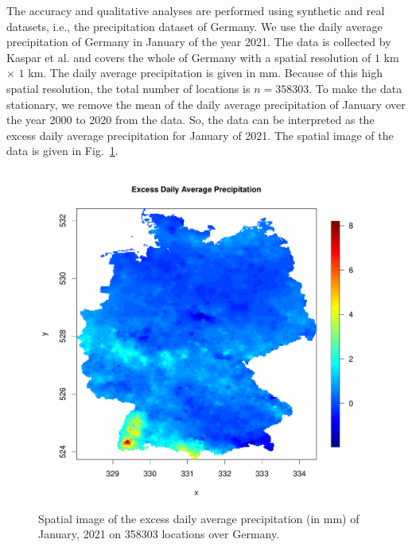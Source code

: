 \documentclass[conference]{IEEEtran}
\begin{document}
The accuracy and qualitative analyses are performed using synthetic and real datasets, i.e., the precipitation dataset of Germany. We use the daily average precipitation of Germany in January of the year 2021. The data is collected by Kaspar et al. \cite{kaspar2013monitoring} and covers the whole of Germany with a spatial resolution of $1$ km $\times$ $1$ km. The daily average precipitation is given in mm. Because of this high spatial resolution, the total number of locations is $n = 358303$. To make the data stationary, we remove the mean of the daily average precipitation of January over the year 2000 to 2020 from the data. So, the data can be interpreted as the excess daily average precipitation for January of 2021. The spatial image of the data is given in Fig.~\ref{fig:data_image}.
\begin{figure}[h]
\centering
\includegraphics[width=0.75\linewidth]{./figures/data_spatial_image.pdf}
  \caption{Spatial image of the excess daily average precipitation (in mm) of January, 2021 on 358303 locations over Germany.
}
  \label{fig:data_image}
\end{figure}
\end{document}
